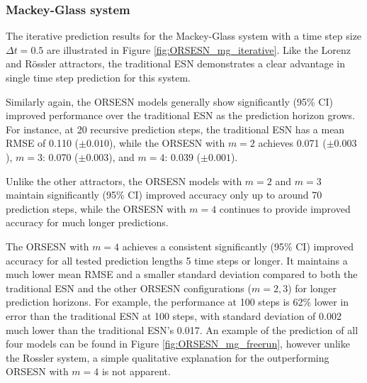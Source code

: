 \subsubsection{Mackey-Glass system}

The iterative prediction results for the Mackey-Glass system with a time step size $\Delta t=0.5$ are illustrated in Figure \ref{fig:ORSESN_mg_iterative}.
Like the Lorenz and R\"ossler attractors, the traditional ESN demonstrates a clear advantage in single time step prediction for this system.

Similarly again, the ORSESN models generally show significantly (95\% CI) improved performance over the traditional ESN as the prediction horizon grows. For instance, at 20 recursive prediction steps, the traditional ESN has a mean RMSE of 0.110 ($\pm 0.010$), while the ORSESN with $m=2$ achieves 0.071 ($\pm 0.003$), $m=3$: 0.070 ($\pm 0.003$), and $m=4$: 0.039 ($\pm 0.001$).

Unlike the other attractors, the ORSESN models with $m=2$ and $m=3$ maintain significantly (95\% CI) improved accuracy only up to around 70 prediction steps, while the ORSESN with $m=4$ continues to provide improved accuracy for much longer predictions.

The ORSESN with $m=4$ achieves a consistent significantly (95\% CI) improved accuracy for all tested prediction lengths 5 time steps or longer. It maintains a much lower mean RMSE and a smaller standard deviation compared to both the traditional ESN and the other ORSESN configurations ($m=2,3$) for longer prediction horizons. For example, the performance at 100 steps is 62\% lower in error than the traditional ESN at 100 steps, with standard deviation of 0.002 much lower than the traditional ESN's 0.017. An example of the prediction of all four models can be found in Figure \ref{fig:ORSESN_mg_freerun}, however unlike the Rossler system, a simple qualitative explanation for the outperforming ORSESN with $m=4$ is not apparent.

